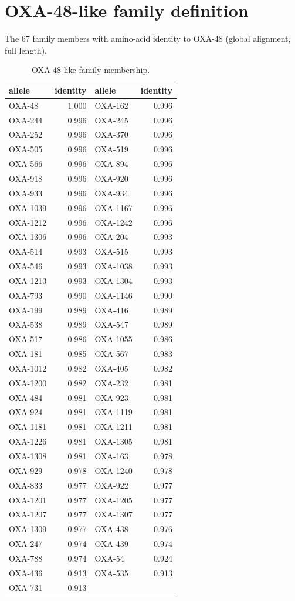 \section{OXA-48-like family definition}
The 67 family members with amino-acid identity to OXA-48 (global alignment, full length).
\begin{longtable}{lrlr}
\caption{OXA-48-like family membership.}\\
\textbf{allele}&\textbf{identity}&\textbf{allele}&\textbf{identity}\\\hline
\endhead
OXA-48&1.000&OXA-162&0.996\\
OXA-244&0.996&OXA-245&0.996\\
OXA-252&0.996&OXA-370&0.996\\
OXA-505&0.996&OXA-519&0.996\\
OXA-566&0.996&OXA-894&0.996\\
OXA-918&0.996&OXA-920&0.996\\
OXA-933&0.996&OXA-934&0.996\\
OXA-1039&0.996&OXA-1167&0.996\\
OXA-1212&0.996&OXA-1242&0.996\\
OXA-1306&0.996&OXA-204&0.993\\
OXA-514&0.993&OXA-515&0.993\\
OXA-546&0.993&OXA-1038&0.993\\
OXA-1213&0.993&OXA-1304&0.993\\
OXA-793&0.990&OXA-1146&0.990\\
OXA-199&0.989&OXA-416&0.989\\
OXA-538&0.989&OXA-547&0.989\\
OXA-517&0.986&OXA-1055&0.986\\
OXA-181&0.985&OXA-567&0.983\\
OXA-1012&0.982&OXA-405&0.982\\
OXA-1200&0.982&OXA-232&0.981\\
OXA-484&0.981&OXA-923&0.981\\
OXA-924&0.981&OXA-1119&0.981\\
OXA-1181&0.981&OXA-1211&0.981\\
OXA-1226&0.981&OXA-1305&0.981\\
OXA-1308&0.981&OXA-163&0.978\\
OXA-929&0.978&OXA-1240&0.978\\
OXA-833&0.977&OXA-922&0.977\\
OXA-1201&0.977&OXA-1205&0.977\\
OXA-1207&0.977&OXA-1307&0.977\\
OXA-1309&0.977&OXA-438&0.976\\
OXA-247&0.974&OXA-439&0.974\\
OXA-788&0.974&OXA-54&0.924\\
OXA-436&0.913&OXA-535&0.913\\
OXA-731&0.913&&\\
\hline\end{longtable}
